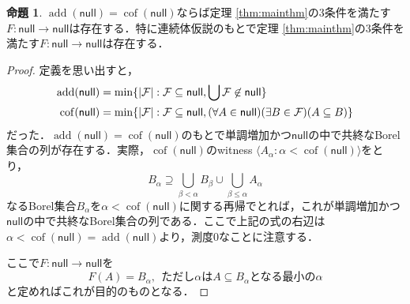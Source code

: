 \documentclass[uplatex,dvipdfmx]{jsarticle}
\newcommand{\add}{\operatorname{add}}
\newcommand{\cof}{\operatorname{cof}}
\newcommand{\nul}{\mathsf{null}}
\DeclarePairedDelimiter\abs{\lvert}{\rvert}
\newcommand{\seq}[1]{{\langle#1\rangle}}
\renewcommand\subset{\subseteq}
\theoremstyle{definition}
\newtheorem{prop}[thm]{命題}
\begin{document}
	\begin{prop}\label{prop:ch}
		$\add(\nul) = \cof(\nul)$ならば定理 \ref{thm:mainthm}の3条件を満たす$F \colon \nul \to \nul$は存在する．特に連続体仮説のもとで定理 \ref{thm:mainthm}の3条件を満たす$F \colon \nul \to \nul$は存在する．
	\end{prop}
	\begin{proof}
		定義を思い出すと，
		\begin{align*}
			 \add(\nul) &= \min \{ \abs{\mathcal{F}} : \mathcal{F} \subset \nul, \bigcup \mathcal{F} \not \in \nul \} \\
			 \cof(\nul) &= \min \{ \abs{\mathcal{F}} : \mathcal{F} \subset \nul, (\forall A \in \nul)(\exists B \in \mathcal{F})(A \subset B) \}
		\end{align*}
		だった．$\add(\nul) = \cof(\nul)$のもとで単調増加かつ$\nul$の中で共終なBorel集合の列が存在する．実際，$\cof(\nul)$のwitness $\seq{A_\alpha : \alpha < \cof(\nul)}$をとり，
		\[
		B_\alpha \supseteq \bigcup_{\beta < \alpha} B_\beta \cup \bigcup_{\beta \le \alpha} A_\alpha
		\]
		なるBorel集合$B_\alpha$を$\alpha < \cof(\nul)$に関する再帰でとれば，これが単調増加かつ$\nul$の中で共終なBorel集合の列である．ここで上記の式の右辺は$\alpha < \cof(\nul) = \add(\nul)$より，測度$0$なことに注意する．
		
		ここで$F \colon \nul \to \nul$を
		\[
		F(A) = B_\alpha,\ \ \text{ただし$\alpha$は$A \subset B_\alpha$となる最小の$\alpha$}
		\]
		と定めればこれが目的のものとなる．
	\end{proof}
	
\end{document}
